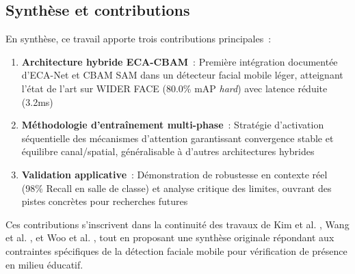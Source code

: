 \begin{onehalfspace}
\subsection{Synthèse et contributions}

\hspace{0.65 cm}En synthèse, ce travail apporte trois contributions principales~:

\begin{enumerate}
\item \textbf{Architecture hybride ECA-CBAM}~: Première intégration documentée d'ECA-Net et CBAM SAM dans un détecteur facial mobile léger, atteignant l'état de l'art sur WIDER FACE (80.0\% mAP \textit{hard}) avec latence réduite (3.2ms)

\item \textbf{Méthodologie d'entraînement multi-phase}~: Stratégie d'activation séquentielle des mécanismes d'attention garantissant convergence stable et équilibre canal/spatial, généralisable à d'autres architectures hybrides

\item \textbf{Validation applicative}~: Démonstration de robustesse en contexte réel (98\% Recall en salle de classe) et analyse critique des limites, ouvrant des pistes concrètes pour recherches futures
\end{enumerate}

\hspace{0.65 cm}Ces contributions s'inscrivent dans la continuité des travaux de Kim et al. \cite{Kim2025FeatherFace}, Wang et al. \cite{Wang2020ECANet, Wang2024ECACBAM}, et Woo et al. \cite{Woo2018CBAM}, tout en proposant une synthèse originale répondant aux contraintes spécifiques de la détection faciale mobile pour vérification de présence en milieu éducatif.

\end{onehalfspace}
